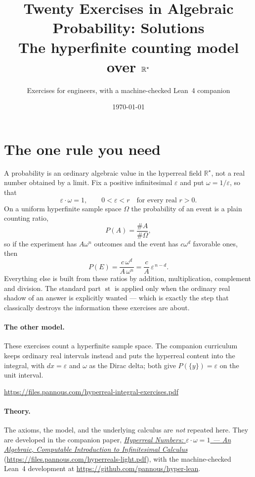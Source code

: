 \documentclass[11pt]{article}
\title{Twenty Exercises in Algebraic Probability: Solutions\\
\large The hyperfinite counting model over $\Rstar$}
\author{Exercises for engineers, with a machine-checked Lean~4 companion}
\date{\today}
\newcommand{\Rstar}{\mathbb{R}^{\star}}
\newcommand{\eps}{\varepsilon}
\newcommand{\st}{\operatorname{st}}
\begin{document}
\maketitle


\section*{The one rule you need}

A probability is an ordinary algebraic value in the hyperreal field $\Rstar$,
not a real number obtained by a limit. Fix a positive infinitesimal $\eps$ and
put $\omega = 1/\eps$, so that
\[
  \eps \cdot \omega = 1,
  \qquad 0 < \eps < r \quad\text{for every real } r > 0 .
\]
On a uniform hyperfinite sample space $\Omega$ the probability of an event is a
plain counting ratio,
\[
  P(A) = \frac{\#A}{\#\Omega},
\]
so if the experiment has $A\omega^{n}$ outcomes and the event has $c\omega^{d}$
favorable ones, then
\[
  P(E) = \frac{c\,\omega^{d}}{A\,\omega^{n}} = \frac{c}{A}\,\eps^{\,n-d}.
\]
Everything else is built from these ratios by addition, multiplication,
complement and division. The standard part $\st$ is applied only when the
ordinary real shadow of an answer is explicitly wanted --- which is exactly the
step that classically destroys the information these exercises are about.

\paragraph{The other model.} These exercises count a hyperfinite sample space.
The companion curriculum keeps ordinary real intervals instead and puts the
hyperreal content into the integral, with $dx=\eps$ and $\omega$ as the Dirac
delta; both give $P(\{y\})=\eps$ on the unit interval.
\begin{center}\small\url{https://files.pannous.com/hyperreal-integral-exercises.pdf}\end{center}

\paragraph{Theory.} The axioms, the model, and the underlying calculus are
\emph{not} repeated here. They are developed in the companion paper,
\href{https://files.pannous.com/hyperreals-light.pdf}{\emph{Hyperreal Numbers: $\eps\cdot\omega=1$ --- An
Algebraic, Computable Introduction to Infinitesimal Calculus}}
(\url{https://files.pannous.com/hyperreals-light.pdf}), with the machine-checked Lean~4 development at
\url{https://github.com/pannous/hyper-lean}.
\end{document}
